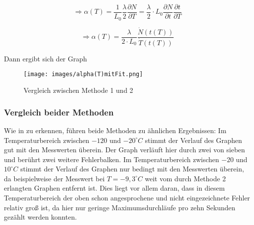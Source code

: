 \begin{equation}
\Rightarrow \alpha(T) = \frac{1}{L_{0}} \frac{\lambda}{2} \frac{\partial N}{\partial T} = \frac{\lambda}{2} \cdot L_{0} \frac{\partial N}{\partial t} \frac{\partial t}{\partial T}
\end{equation}

\begin{equation}
\Rightarrow \alpha (T) = \frac{\lambda}{2 \cdot L_{0}} \frac{\dot{N}(t(T))}{\dot{T}(t(T))}
\end{equation}  

Dann ergibt sich der Graph 


\begin{figure}
\centering
        \texttt{[image: images/alpha(T)mitFit.png]}
\caption{Vergleich zwischen Methode 1 und 2}
\label{alpha(T)mitFit}
\end{figure}


\subsubsection{Vergleich beider Methoden}
Wie in  zu erkennen, führen beide Methoden zu ähnlichen Ergebnissen: Im Temperaturbereich zwischen $ -120 $ und $ -20 ^{\circ} C $ stimmt der Verlauf des Graphen gut mit den Messwerten überein. Der Graph verläuft hier durch zwei von sieben und berührt zwei weitere Fehlerbalken. Im Temperaturbereich zwischen $ -20 $ und $ 10 ^{\circ} C $ stimmt der Verlauf des Graphen nur bedingt mit den Messwerten überein, da beispielweise der Messwert bei $T = -9,3 ^{\circ} C $ weit vom durch Methode 2 erlangten Graphen entfernt ist. Dies liegt vor allem daran, dass in diesem Temperaturbereich der oben schon angesprochene und nicht eingezeichnete Fehler relativ groß ist, da hier nur geringe Maximumsdurchläufe pro zehn Sekunden gezählt werden konnten.

